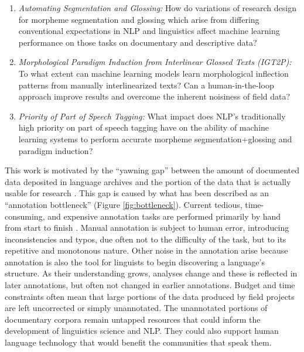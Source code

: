 \begin{enumerate}
\item{} \emph{Automating Segmentation and Glossing:} How do variations of research design for morpheme segmentation and glossing which arise from differing conventional expectations in NLP and linguistics affect machine learning performance on those tasks on documentary and descriptive data? 

\item{} \emph{Morphological Paradigm Induction from Interlinear Glossed Texts (IGT2P):} To what extent can machine learning models learn morphological inflection patterns from manually interlinearized texts? Can a human-in-the-loop approach improve results and overcome the inherent noisiness of field data?

\item \emph{Priority of Part of Speech Tagging:} 
What impact does NLP's traditionally high priority on part of speech tagging have on the ability of machine learning systems to perform accurate morpheme segmentation+glossing and paradigm induction?
\end{enumerate}

This work is motivated by the “yawning gap” between the amount of documented data deposited in language archives and the portion of the data that is actually usable for research \citep{seifart_language_2018}. This gap is caused by what has been described as an ``annotation bottleneck'' (Figure \ref{fig:bottleneck}). Current tedious, time-consuming, and expensive annotation tasks are performed primarily by hand from start to finish \citep{simons_worlds_2013,holton_developing_2017}. Manual annotation is subject to human error, introducing inconsistencies and typos, due often not to the difficulty of the task, but to its repetitive and monotonous nature. Other noise in the annotation arise because annotation is also the tool for linguists to begin discovering a language's structure. As their understanding grows, analyses change and these is reflected in later annotations, but often not changed in earlier annotations.
Budget and time constraints often mean that large portions of the data produced by field projects are left uncorrected or simply unannotated. The unannotated portions of documentary corpora remain untapped resources that could inform the development of linguistics science and NLP. They could also support human language technology that would benefit the communities that speak them. 

